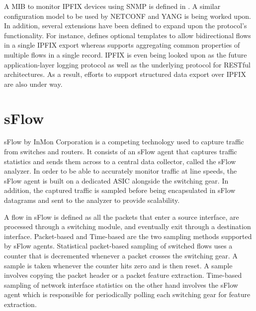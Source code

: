 A \ac{MIB} to monitor \ac{IPFIX} devices using \ac{SNMP} is defined in \cite{rfc5815}. A similar configuration model to be used by NETCONF and YANG is being worked upon. In addition, several extensions have been defined to expand upon the protocol's functionality. For instance, \cite{rfc5103} defines optional templates to allow  bidirectional flows in a single \ac{IPFIX} export whereas \cite{rfc5474} supports aggregating common properties of multiple flows in a single record. \ac{IPFIX} is even being looked upon as the future application-layer logging protocol as well as the underlying protocol for RESTful architectures. As a result, efforts to support structured data export over \ac{IPFIX} are also under way.

\section{sFlow}\label{sec:sflow}
sFlow \cite{rfc3176} by InMon Corporation is a competing technology used to capture traffic from switches and routers. It consists of an sFlow agent that captures traffic statistics and sends them across to a central data collector, called the sFlow analyzer. In order to be able to accurately monitor traffic at line speeds, the sFlow agent is built on a dedicated ASIC alongside the switching gear. In addition, the captured traffic is sampled before being encapsulated in sFlow datagrams and sent to the analyzer to provide scalability.

A flow in sFlow is defined as all the packets that enter a source interface, are processed through a switching module, and eventually exit through a destination interface. Packet-based and Time-based are the two sampling methods supported by sFlow agents. Statistical packet-based sampling of switched flows uses a  counter that is decremented whenever a packet crosses the switching gear. A sample is taken whenever the counter hits zero and is then reset. A sample involves copying the packet header or a packet feature extraction. Time-based sampling of network interface statistics on the other hand involves the sFlow agent which is responsible for periodically polling each switching gear for feature extraction.






